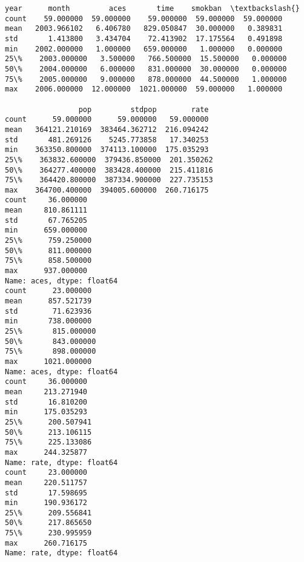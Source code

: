 \documentclass[11pt]{article}
\begin{document}
    \begin{Verbatim}[commandchars=\\\{\}]
              year      month         aces       time    smokban  \textbackslash{}
count    59.000000  59.000000    59.000000  59.000000  59.000000
mean   2003.966102   6.406780   829.050847  30.000000   0.389831
std       1.413800   3.434704    72.413902  17.175564   0.491898
min    2002.000000   1.000000   659.000000   1.000000   0.000000
25\%    2003.000000   3.500000   766.500000  15.500000   0.000000
50\%    2004.000000   6.000000   831.000000  30.000000   0.000000
75\%    2005.000000   9.000000   878.000000  44.500000   1.000000
max    2006.000000  12.000000  1021.000000  59.000000   1.000000

                 pop         stdpop        rate
count      59.000000      59.000000   59.000000
mean   364121.210169  383464.362712  216.094242
std       481.269126    5245.773858   17.340253
min    363350.800000  374113.100000  175.035293
25\%    363832.600000  379436.850000  201.350262
50\%    364277.400000  383428.400000  215.411816
75\%    364420.800000  387334.900000  227.735153
max    364700.400000  394005.600000  260.716175
count     36.000000
mean     810.861111
std       67.765205
min      659.000000
25\%      759.250000
50\%      811.000000
75\%      858.500000
max      937.000000
Name: aces, dtype: float64
count      23.000000
mean      857.521739
std        71.623936
min       738.000000
25\%       815.000000
50\%       843.000000
75\%       898.000000
max      1021.000000
Name: aces, dtype: float64
count     36.000000
mean     213.271940
std       16.810200
min      175.035293
25\%      200.507941
50\%      213.106115
75\%      225.133086
max      244.325877
Name: rate, dtype: float64
count     23.000000
mean     220.511757
std       17.598695
min      190.936172
25\%      209.556841
50\%      217.865650
75\%      230.995959
max      260.716175
Name: rate, dtype: float64
    \end{Verbatim}
\end{document}
